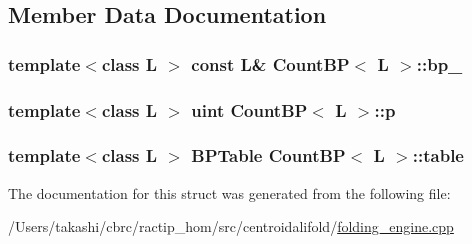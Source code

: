 \subsection{Member Data Documentation}
\hypertarget{struct_count_b_p_a4da16caf4616d8c453998871ba03bbad}{
\subsubsection[{bp\+\_\+}]{\setlength{\rightskip}{0pt plus 5cm}template$<$class L $>$ const L\& {\bf Count\+B\+P}$<$ L $>$\+::bp\+\_\+}}\label{struct_count_b_p_a4da16caf4616d8c453998871ba03bbad}
\hypertarget{struct_count_b_p_a92de403d8e8a52294a85dbe93ce1e8b9}{
\subsubsection[{p}]{\setlength{\rightskip}{0pt plus 5cm}template$<$class L $>$ {\bf uint} {\bf Count\+B\+P}$<$ L $>$\+::p}}\label{struct_count_b_p_a92de403d8e8a52294a85dbe93ce1e8b9}
\hypertarget{struct_count_b_p_ae4266a3c6b2c80dc0f8bdb82124630c5}{
\subsubsection[{table}]{\setlength{\rightskip}{0pt plus 5cm}template$<$class L $>$ {\bf B\+P\+Table} {\bf Count\+B\+P}$<$ L $>$\+::table}}\label{struct_count_b_p_ae4266a3c6b2c80dc0f8bdb82124630c5}


The documentation for this struct was generated from the following file\+:\begin{DoxyCompactItemize}
\item 
/\+Users/takashi/cbrc/ractip\+\_\+hom/src/centroidalifold/\hyperlink{folding__engine_8cpp}{folding\+\_\+engine.\+cpp}\end{DoxyCompactItemize}
